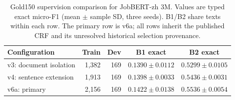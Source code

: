 \begin{table}[htbp]
\caption{Gold150 supervision comparison for JobBERT-zh 3M. Values are typed exact micro-F1 (mean $\pm$ sample SD, three seeds). B1/B2 share texts within each row. The primary row is v6a; all rows inherit the published CRF and its unresolved historical selection provenance.}
\label{tab:gold150-main}
\centering
\small
\begin{tabular}{@{}lrrcc@{}}
\toprule
Configuration & Train & Dev & B1 exact & B2 exact \\
\midrule
v3: document isolation & 1,382 & 169 & $0.1390\pm0.0112$ & $0.5299\pm0.0105$ \\
v4: sentence extension & 1,913 & 169 & $0.1398\pm0.0033$ & $0.5436\pm0.0031$ \\
v6a: primary & 2,156 & 169 & $0.1422\pm0.0138$ & $\mathbf{0.5536\pm0.0054}$ \\
\bottomrule
\end{tabular}
\end{table}
